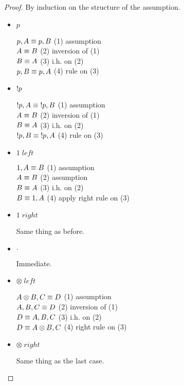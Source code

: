 \begin{proof}
   By induction on the structure of the assumption.
   
   \begin{itemize}
      \item $p$
      
      $p, A \equiv p, B$ \hfill (1) assumption \\
      $A \equiv B$ \hfill (2) inversion of (1) \\
      $B \equiv A$ \hfill (3) i.h. on (2) \\
      $p, B \equiv p, A$ \hfill (4) rule on (3) \\
      
      \item ${!} p$
      
      ${!} p, A \equiv {!} p, B$ \hfill (1) assumption \\
      $A \equiv B$ \hfill (2) inversion of (1) \\
      $B \equiv A$ \hfill (3) i.h. on (2) \\
      ${!} p, B \equiv {!} p, A$ \hfill (4) rule on (3) \\
      
      \item $1 \; left$
      
      $1, A \equiv B$ \hfill (1) assumption \\
      $A \equiv B$ \hfill (2) assumption \\
      $B \equiv A$ \hfill (3) i.h. on (2) \\
      $B \equiv 1, A$ \hfill (4) apply right rule on (3) \\
      
      \item $1 \; right$
      
      Same thing as before.
      
      \item $\cdot$

      Immediate.

      \item $\otimes \; left$

      $A \otimes B, C \equiv D$ \hfill (1) assumption \\
      $A, B, C \equiv D$ \hfill (2) inversion of (1) \\
      $D \equiv A, B, C$ \hfill (3) i.h. on (2) \\
      $D \equiv A \otimes B, C$ \hfill (4) right rule on (3) \\

      \item $\otimes \; right$

      Same thing as the last case.
   \end{itemize}
\end{proof}

